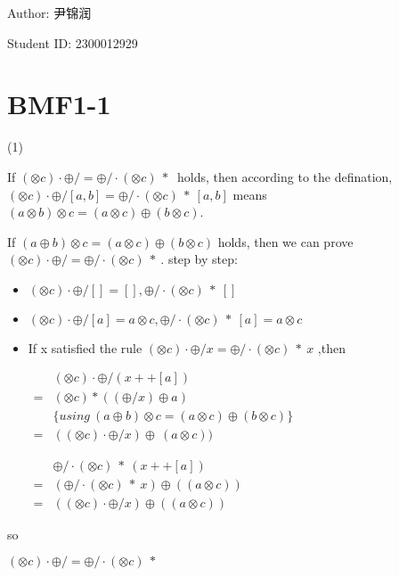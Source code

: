 \documentclass[UTF-8]{ctexart}
\begin{document}
Author: 尹锦润

Student ID: 2300012929





\section{BMF1-1}

(1)

If $\displaystyle ( \otimes c) \cdotp \oplus /=\oplus /\cdotp ( \otimes c) \ *\ $ holds, then according to the defination, \ $\displaystyle ( \otimes c) \cdotp \oplus /[ a,b] =\oplus /\cdotp ( \otimes c) \ *\ [ a,b]$ means $\displaystyle ( a\otimes b) \otimes c=( a\otimes c) \oplus ( b\otimes c)$.

If $\displaystyle ( a\oplus b) \otimes c=( a\otimes c) \oplus ( b\otimes c)$ holds, then we can prove $\displaystyle ( \otimes c) \cdotp \oplus /=\oplus /\cdotp ( \otimes c) \ *\ .$ step by step:
\begin{itemize}
	\item $\displaystyle ( \otimes c) \cdotp \oplus /[] =[] ,\oplus /\cdotp ( \otimes c) \ *\ []$
	\item $\displaystyle ( \otimes c) \cdotp \oplus /[ a] =a\otimes c,\oplus /\cdotp ( \otimes c) \ *\ [ a] =a\otimes c$
	\item If x satisfied the rule $\displaystyle ( \otimes c) \cdotp \oplus /x=\oplus /\cdotp ( \otimes c) \ *\ x$ ,then
	
	$\displaystyle \begin{aligned}
		& ( \otimes c) \cdotp \oplus /( x++[ a])\\
		= & ( \otimes c) *(( \oplus /x) \oplus a)\\
		& \{using\ ( a\oplus b) \otimes c=( a\otimes c) \oplus ( b\otimes c)\}\\
		= & (( \otimes c) \cdotp \oplus /x) \oplus \ ( a\otimes c))
	\end{aligned}$
	
	
	
	$\displaystyle \begin{aligned}
		& \oplus /\cdotp ( \otimes c) \ *\ ( x++[ a])\\
		= & ( \oplus /\cdotp ( \otimes c) \ *\ x) \oplus (( a\otimes c))\\
		= & (( \otimes c) \cdotp \oplus /x) \oplus (( a\otimes c))
	\end{aligned}$
\end{itemize}

so
\begin{center}
	$\displaystyle ( \otimes c) \cdotp \oplus /=\oplus /\cdotp ( \otimes c) \ *\ $ 
\end{center}
\end{document}
